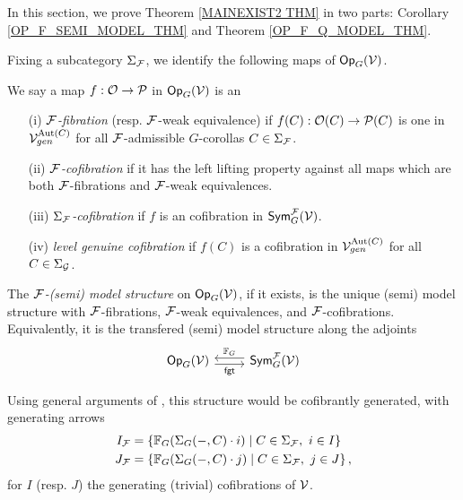 \documentclass[a4paper,10pt]{article}%
\begin{document}
In this section, we prove Theorem \ref{MAINEXIST2 THM} in two parts: Corollary \ref{OP_F_SEMI_MODEL_THM} and Theorem \ref{OP_F_Q_MODEL_THM}.

Fixing a subcategory $\Sigma_{\mathcal F}$, we identify the following maps of $\mathsf{Op}_G(\mathcal V)$.
\begin{definition} 
  We say a map $f: \mathcal{O} \to \mathcal{P}$ in $\mathsf{Op}_G(\mathcal V)$ is an  
  \begin{itemize} 
  \item[(i)] \textit{$\mathcal F$-fibration} (resp. $\mathcal F$-weak equivalence) if $f(C):\mathcal{O}(C) \to \mathcal{P}(C)$ is one in $\mathcal V^{\mathrm{Aut}(C)}_{gen}$ for all $\mathcal F$-admissible $G$-corollas $C\in\Sigma_{\mathcal F}$. 
  \item[(ii)] \textit{$\mathcal F$-cofibration} if it has the left lifting property against all maps which are both $\mathcal F$-fibrations and $\mathcal F$-weak equivalences. 
  \item[(iii)] \textit{$\Sigma_{\mathcal F}$-cofibration} if $f$ is an cofibration in $\mathsf{Sym}_G^{\mathcal F}(\mathcal V)$. 
  \item[(iv)] \textit{level genuine cofibration} if $f(C)$ is a cofibration in $\mathcal V^{\mathrm{Aut}(C)}_{gen}$ for all $C\in \Sigma_{\mathcal{G}}$. 
  \end{itemize} 
\end{definition} 


\begin{definition} 
  The \textit{$\mathcal F$-(semi) model structure} on $\mathsf{Op}_G(\mathcal V)$, if it exists, is the unique (semi) model structure with $\mathcal F$-fibrations, $\mathcal F$-weak equivalences, and $\mathcal F$-cofibrations. Equivalently, it is the transfered (semi) model structure along the adjoints 
  \[ 
  \begin{tikzcd} 
    \Op_G(\V) \arrow[r, shift right, "\mathsf{fgt}"'] & \Sym_G^\F(\V) \arrow[l, shift right, "\mathbb F_G"']
  \end{tikzcd} 
  \] 
\end{definition} 

Using general arguments of \cite{SS00}, this structure would be cofibrantly generated, with generating arrows 
\begin{align*} 
  I_{\mathcal F} &= \left\{ \mathbb F_G(\Sigma_G(-,C) \cdot i) \;|\; C \in \Sigma_{\mathcal F},\ i\in I\right\}\\ 
  J_{\mathcal F} &= \left\{ \mathbb F_G(\Sigma_G(-,C) \cdot j) \;|\; C \in \Sigma_{\mathcal F},\ j\in J\right\}, 
\end{align*} 
for $I$ (resp. $J$) the generating (trivial) cofibrations of $\mathcal V$. 
\end{document}
